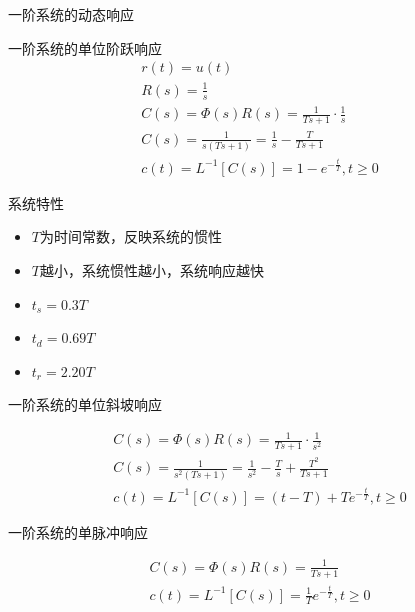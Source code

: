 \begin{frame}{一阶系统的动态响应}
\begin{block}{一阶系统的单位阶跃响应}
\begin{eqnarray*}
r(t)=u(t)\\
R(s)=\frac{1}{s}\\
C(s)=\Phi(s)R(s)=\frac{1}{Ts+1}\cdot\frac{1}{s}\\
C(s)=\frac{1}{s(Ts+1)}=\frac{1}{s}-\frac{T}{Ts+1}\\
c(t)=L^{-1}[C(s)]=1-e^{-\frac{t}{T}},t\geq 0
\end{eqnarray*}
\end{block}
\end{frame}
\begin{frame}
\begin{block}{系统特性}
\begin{itemize}
\item<+-> $T$为时间常数，反映系统的惯性
\item<+-> $T$越小，系统惯性越小，系统响应越快
\item<+-> $t_s=0.3T$
\item<+-> $t_d=0.69T$
\item<+-> $t_r=2.20T$
\end{itemize}
\end{block}
\end{frame}
\begin{frame}{一阶系统的单位斜坡响应}
\begin{block}{}
\begin{eqnarray*}
C(s)=\Phi(s)R(s)=\frac{1}{Ts+1}\cdot\frac{1}{s^2}\\
C(s)=\frac{1}{s^2(Ts+1)}=\frac{1}{s^2}-\frac{T}{s}+
\frac{T^2}{Ts+1}\\
c(t)=L^{-1}[C(s)]=(t-T)+Te^{-\frac{t}{T}},t\geq 0
\end{eqnarray*}
\end{block}
\end{frame}
\begin{frame}{一阶系统的单脉冲响应}
\begin{block}{}
\begin{eqnarray*}
C(s)=\Phi(s)R(s)=\frac{1}{Ts+1}\\
c(t)=L^{-1}[C(s)]=\frac{1}{T}e^{-\frac{t}{T}},t\geq 0
\end{eqnarray*}
\end{block}
\end{frame}